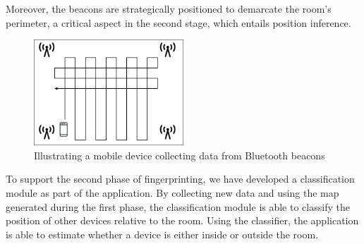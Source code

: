 Moreover, the beacons are strategically positioned to demarcate the room's perimeter, a critical aspect in the second stage, which entails position inference.

\begin{figure}[H]
    \centering
    \includegraphics[width=0.5\textwidth]{images/CreateMap.drawio.png}
    \caption{Illustrating a mobile device collecting data from Bluetooth beacons}
    \label{fig:CreateMap}
\end{figure}

To support the second phase of fingerprinting, we have developed a classification module as part of the application. 
By collecting new data and using the map generated during the first phase, the classification module is able to classify the position of other devices relative to the room. 
Using the classifier, the application is able to estimate whether a device is either inside or outside the room.

